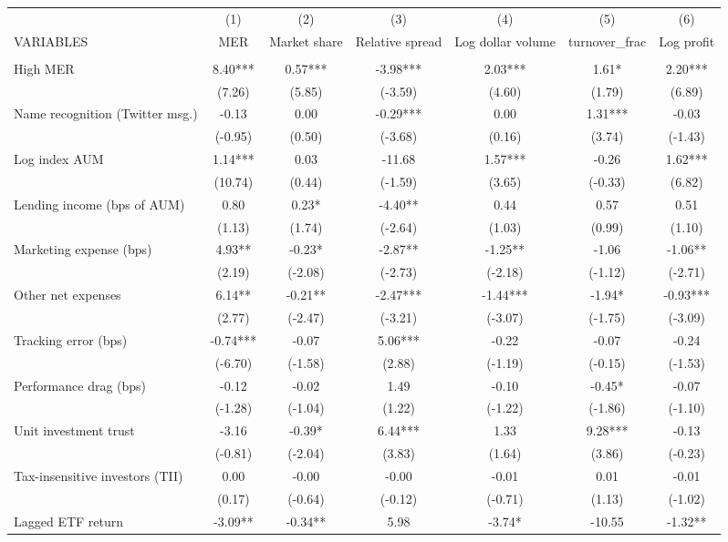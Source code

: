 \documentclass[]{article}
\begin{document}
\begin{tabular}{lcccccc} \hline
 & (1) & (2) & (3) & (4) & (5) & (6) \\
VARIABLES & MER & Market share & Relative spread & Log dollar volume & turnover\_frac & Log profit \\ \hline
 &  &  &  &  &  &  \\
High MER & 8.40*** & 0.57*** & -3.98*** & 2.03*** & 1.61* & 2.20*** \\
 & (7.26) & (5.85) & (-3.59) & (4.60) & (1.79) & (6.89) \\
Name recognition (Twitter msg.) & -0.13 & 0.00 & -0.29*** & 0.00 & 1.31*** & -0.03 \\
 & (-0.95) & (0.50) & (-3.68) & (0.16) & (3.74) & (-1.43) \\
Log index AUM & 1.14*** & 0.03 & -11.68 & 1.57*** & -0.26 & 1.62*** \\
 & (10.74) & (0.44) & (-1.59) & (3.65) & (-0.33) & (6.82) \\
Lending income (bps of AUM) & 0.80 & 0.23* & -4.40** & 0.44 & 0.57 & 0.51 \\
 & (1.13) & (1.74) & (-2.64) & (1.03) & (0.99) & (1.10) \\
Marketing expense (bps) & 4.93** & -0.23* & -2.87** & -1.25** & -1.06 & -1.06** \\
 & (2.19) & (-2.08) & (-2.73) & (-2.18) & (-1.12) & (-2.71) \\
Other net expenses & 6.14** & -0.21** & -2.47*** & -1.44*** & -1.94* & -0.93*** \\
 & (2.77) & (-2.47) & (-3.21) & (-3.07) & (-1.75) & (-3.09) \\
Tracking error (bps) & -0.74*** & -0.07 & 5.06*** & -0.22 & -0.07 & -0.24 \\
 & (-6.70) & (-1.58) & (2.88) & (-1.19) & (-0.15) & (-1.53) \\
Performance drag (bps) & -0.12 & -0.02 & 1.49 & -0.10 & -0.45* & -0.07 \\
 & (-1.28) & (-1.04) & (1.22) & (-1.22) & (-1.86) & (-1.10) \\
Unit investment trust & -3.16 & -0.39* & 6.44*** & 1.33 & 9.28*** & -0.13 \\
 & (-0.81) & (-2.04) & (3.83) & (1.64) & (3.86) & (-0.23) \\
Tax-insensitive investors (TII) & 0.00 & -0.00 & -0.00 & -0.01 & 0.01 & -0.01 \\
 & (0.17) & (-0.64) & (-0.12) & (-0.71) & (1.13) & (-1.02) \\
Lagged ETF return & -3.09** & -0.34** & 5.98 & -3.74* & -10.55 & -1.32** \\

\end{tabular}
\end{document}
